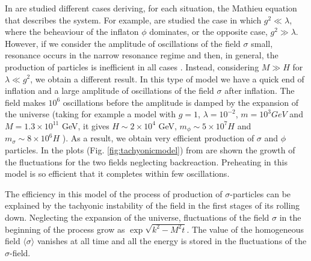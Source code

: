 \documentclass[11pt,a4paper,twoside]{book}
\begin{document}
In \cite{Chap4:TachyonicPreheating} are studied different cases deriving, for each situation, the Mathieu equation that describes the system. For example, are studied the case in which  $g^{2} \ll \lambda$, where the beheaviour of the inflaton $\phi$ dominates, or the opposite case,  $g^{2} \gg \lambda$. However, if we consider the amplitude of oscillations of the field $\sigma$ small, resonance occurs in the narrow resonance regime and then, in general, the production of particles is inefficient in all cases . Instead, considering $ M \gg H $ for $ \lambda \ll g^{2} $, we obtain a different result. In this type of model we have a quick end of inflation and a large amplitude of oscillations of the field $\sigma$ after inflation. The field makes $ 10^{6} $ oscillations before the amplitude is damped by the expansion of the universe (taking for example a model with $ g=1$, $\lambda=10^{-2}$, $ m=10^{3} GeV $ and $ M=1.3 \times 10^{11} $ GeV, it gives $ H \sim 2\times 10^{4}$ GeV, $ m_{\phi} \sim 5 \times 10^{7} H $ and $ m_{\sigma} \sim 8 \times 10^{6} H $ ). 
As a result, we obtain very efficient production of $\sigma$ and $\phi$ particles. In the plots (Fig. \ref{fig:tachyonicmodel}) from \cite{Chap4:TachyonicPreheating} are shown the growth of the fluctuations for the two fields neglecting backreaction. Preheating in this model is so efficient that it completes within few oscillations.

The efficiency in this model of the process of production of $\sigma$-particles can be explained by the tachyonic instability of the field in the first stages of its rolling down. Neglecting the expansion of the universe, fluctuations of the field $\sigma$ in the beginning of the process grow as $\exp \sqrt{k^{2}-M^{2}t}$. The value of the homogeneous field $ \langle \sigma\rangle  $ vanishes at all time and all the energy is stored in the fluctuations of the $\sigma$-field.
\end{document}
